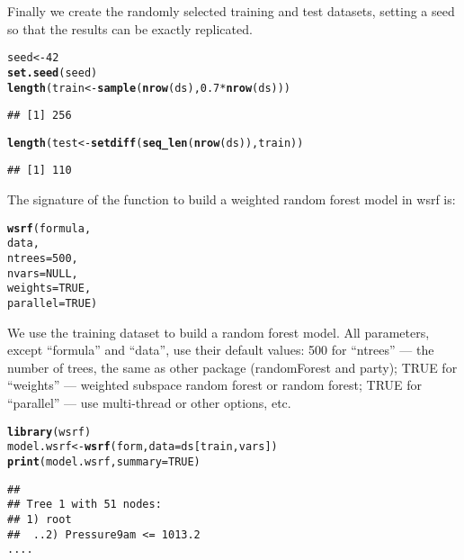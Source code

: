 \documentclass[11pt,a4paper]{article}\usepackage{graphicx, color}
\makeatletter
\newcommand{\hlfunctioncall}[1]{\textcolor[rgb]{0.501960784313725,0,0.329411764705882}{\textbf{#1}}}%
\newenvironment{kframe}{%
 \def\at@end@of@kframe{}%
 \ifinner\ifhmode%
  \def\at@end@of@kframe{\end{minipage}}%
  \begin{minipage}{\columnwidth}%
 \fi\fi%
 \def\FrameCommand##1{\hskip\@totalleftmargin \hskip-\fboxsep
 \colorbox{shadecolor}{##1}\hskip-\fboxsep
     \hskip-\linewidth \hskip-\@totalleftmargin \hskip\columnwidth}%
 \MakeFramed {\advance\hsize-\width
   \@totalleftmargin\z@ \linewidth\hsize
   \@setminipage}}%
 {\par\unskip\endMakeFramed%
 \at@end@of@kframe}
\newenvironment{knitrout}{}{} %
\newcommand{\pkg}[1]{{\fontseries{b}\selectfont #1}}
\makeatother
\begin{document}
Finally we create the randomly selected training and test datasets,
setting a seed so that the results can be exactly replicated.

\begin{knitrout}
\color{fgcolor}\begin{kframe}
\begin{alltt}
seed <- 42
\hlfunctioncall{set.seed}(seed)
\hlfunctioncall{length}(train <- \hlfunctioncall{sample}(\hlfunctioncall{nrow}(ds), 0.7*\hlfunctioncall{nrow}(ds)))
\end{alltt}
\begin{verbatim}
## [1] 256
\end{verbatim}
\begin{alltt}
\hlfunctioncall{length}(test <- \hlfunctioncall{setdiff}(\hlfunctioncall{seq_len}(\hlfunctioncall{nrow}(ds)), train))
\end{alltt}
\begin{verbatim}
## [1] 110
\end{verbatim}
\end{kframe}
\end{knitrout}


The signature of the function to build a weighted random forest model
in \pkg{wsrf} is:

\begin{knitrout}
\color{fgcolor}\begin{kframe}
\begin{alltt}
\hlfunctioncall{wsrf}(formula, 
     data, 
     ntrees=500, 
     nvars=NULL,
     weights=TRUE, 
     parallel=TRUE)
\end{alltt}
\end{kframe}
\end{knitrout}


We use the training dataset to build a random forest model.  All
parameters, except ``formula'' and ``data'', use their default values:
500 for ``ntrees'' --- the number of trees, the same as other package
(\pkg{randomForest} and \pkg{party}); TRUE for ``weights'' ---
weighted subspace random forest or random forest; TRUE for
``parallel'' --- use multi-thread or other options, etc.

\begin{knitrout}
\color{fgcolor}\begin{kframe}
\begin{alltt}
\hlfunctioncall{library}(wsrf)
model.wsrf <- \hlfunctioncall{wsrf}(form, data=ds[train, vars])
\hlfunctioncall{print}(model.wsrf, summary=TRUE)
\end{alltt}
\begin{verbatim}
## 
## Tree 1 with 51 nodes:
## 1) root
##  ..2) Pressure9am <= 1013.2
....
\end{verbatim}
\end{kframe}
\end{knitrout}
\end{document}
